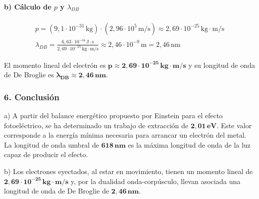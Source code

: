 \paragraph*{b) Cálculo de $p$ y $\lambda_{DB}$}
\begin{gather}
    p = (9,1\cdot10^{-31}\,\text{kg}) \cdot (2,96\cdot10^5\,\text{m/s}) \approx 2,69 \cdot 10^{-25} \, \text{kg}\cdot\text{m/s} \\
    \lambda_{DB} = \frac{6,63\cdot10^{-34}\,\text{J}\cdot\text{s}}{2,69\cdot10^{-25}\,\text{kg}\cdot\text{m/s}} \approx 2,46 \cdot 10^{-9} \, \text{m} = 2,46\,\text{nm}
\end{gather}
\begin{cajaresultado}
    El momento lineal del electrón es $\boldsymbol{p \approx 2,69 \cdot 10^{-25} \, \textbf{kg}\cdot\textbf{m/s}}$ y su longitud de onda de De Broglie es $\boldsymbol{\lambda_{DB} \approx 2,46 \, \textbf{nm}}$.
\end{cajaresultado}

\subsubsection*{6. Conclusión}
\begin{cajaconclusion}
a) A partir del balance energético propuesto por Einstein para el efecto fotoeléctrico, se ha determinado un trabajo de extracción de $\mathbf{2,01 \, eV}$. Este valor corresponde a la energía mínima necesaria para arrancar un electrón del metal. La longitud de onda umbral de $\mathbf{618 \, nm}$ es la máxima longitud de onda de la luz capaz de producir el efecto.

b) Los electrones eyectados, al estar en movimiento, tienen un momento lineal de $\mathbf{2,69 \cdot 10^{-25} \, kg \cdot m/s}$ y, por la dualidad onda-corpúsculo, llevan asociada una longitud de onda de De Broglie de $\mathbf{2,46 \, nm}$.
\end{cajaconclusion}

\newpage



